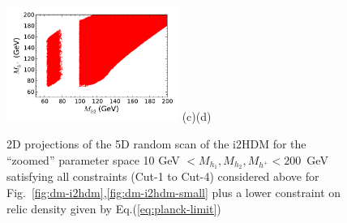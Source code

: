 \begin{figure}[htb]
\hspace*{-0.2cm}\includegraphics[width=0.50\textwidth]{Figures/Mhc_Mh2_Omega_zoom-cut123456789_zz-monoc.pdf}
\vskip -0.8cm
\hspace*{1cm}(c)\hspace*{0.55\textwidth}\hspace*{-1.5cm}(d)
\caption{2D projections of the 5D random scan of the i2HDM for the ``zoomed'' parameter space
10 GeV $< M_{h_1}, M_{h_2}, M_{h^{+}} < 200$~GeV satisfying all constraints
(Cut-1 to Cut-4) considered above for Fig.~\ref{fig:dm-i2hdm},\ref{fig:dm-i2hdm-small} plus a
lower constraint on relic density given by  Eq.(\ref{eq:planck-limit})}
\label{fig:dm-i2hdm-relic-small}
\end{figure}

